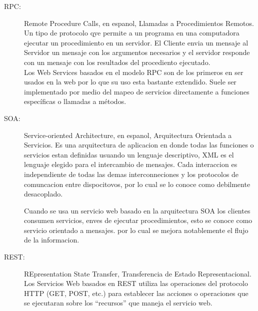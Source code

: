 \begin{description}
  \item[RPC:] Remote Procedure Calls, en espanol, Llamadas a Procedimientos Remotos. Un tipo de protocolo qye permite a un programa en una computadora ejecutar un procedimiento en un servidor. El Cliente envia un mensaje al Servidor un mensaje con los argumentos necesarios y el servidor responde con un mensaje con los resultados del procediento ejecutado.\\

  Los Web Services basados en el modelo RPC son de los primeros en ser usados en la web por lo que su uso esta bastante extendido. Suele ser implementado por medio del mapeo de servicios directamente a funciones específicas o llamadas a métodos.


  \item[SOA:] Service-oriented Architecture, en espanol, Arquitectura Orientada a Servicios.
Es una arquitectura de aplicacion en donde todas las funciones o servicios estan definidas usuando un lenguaje descriptivo, XML es el lenguaje elegido para el intercambio de mensajes. Cada interaccion es independiente de todas las demas interconneciones y los protocolos de comuncacion entre dispocitovos, por lo cual se lo conoce como debilmente desacoplado.

Cuando se usa un servicio web basado en la arquitectura SOA los clientes consumen servicios, enves de ejecutar procedimientos, esto se conoce como servicio orientado a mensajes. por lo cual se mejora notablemente el flujo de la informacion.


  \item[REST:] REpresentation State Transfer, Transferencia de Estado Representacional.
  Los Servicios Web basados en REST utiliza las operaciones del protocolo HTTP (GET, POST, etc.) para establecer las acciones o operaciones que se ejecutaran sobre los ``recursos'' que maneja el servicio web.

\end{description}

